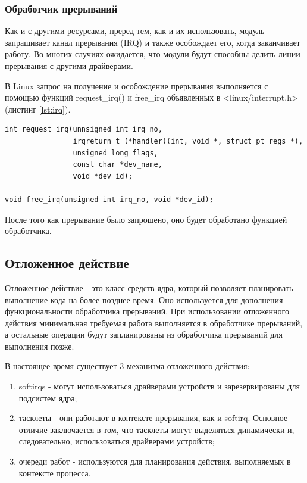 \subsubsection{Обработчик прерываний}
Как и с другими ресурсами, преред тем, как и их использовать, модуль запрашивает канал прерывания (IRQ) и также особождает его, когда заканчивает работу.
Во многих случиях ожидается, что модули будут способны делить линии прерывания с другими драйверами.

В Linux запрос на получение и особождение прерывания выполняется с помощью функций request\_irq() и free\_irq объявленных в <linux/interrupt.h> (листинг \ref{lst:irq}).
\begin{lstlisting}[caption={Функция request\_irq() и free\_irq()}, label={lst:irq}]
int request_irq(unnsigned int irq_no,
				irqreturn_t (*handler)(int, void *, struct pt_regs *),
				unsigned long flags,
				const char *dev_name,
				void *dev_id);

void free_irq(unsigned int irq_no, void *dev_id);
\end{lstlisting}

После того как прерывание было запрошено, оно будет обработано функцией обработчика.

\subsection{Отложенное действие}
Отложенное действие - это класс средств ядра, который позволяет планировать выполнение кода на более позднее время.
Оно используется для дополнения функциональности обработчика прерываний.
При использовании отложенного действия минимальная требуемая работа выполняется в обработчике прерываний, а остальные операции будут запланированы из обработчика прерываний для выполнения позже. 

В настоящее время существует 3 механизма отложенного действия:
\begin{enumerate}
	\item softirqs - могут использоваться драйверами устройств и зарезервированы для подсистем ядра;
	\item тасклеты - они работают в контексте прерывания, как и softirq.
	Основное отличие заключается в том, что тасклеты могут выделяться динамически и, следовательно, использоваться драйверами устройств;
	\item очереди работ - используются для планирования действия, выполняемых в контексте процесса.
\end{enumerate}

